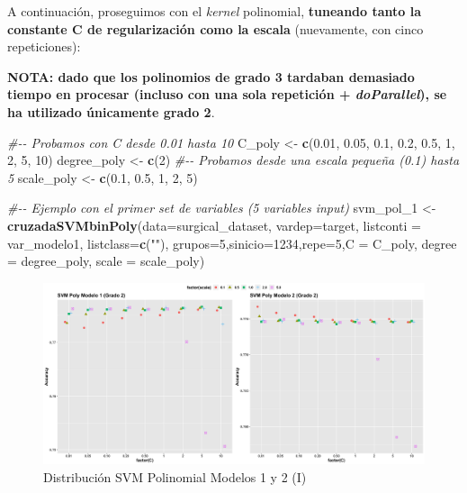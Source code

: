 \documentclass[
]{article}
\newenvironment{Shaded}{\begin{snugshade}}{\end{snugshade}}
\newcommand{\CommentTok}[1]{\textcolor[rgb]{0.56,0.35,0.01}{\textit{#1}}}
\newcommand{\DataTypeTok}[1]{\textcolor[rgb]{0.13,0.29,0.53}{#1}}
\newcommand{\DecValTok}[1]{\textcolor[rgb]{0.00,0.00,0.81}{#1}}
\newcommand{\FloatTok}[1]{\textcolor[rgb]{0.00,0.00,0.81}{#1}}
\newcommand{\KeywordTok}[1]{\textcolor[rgb]{0.13,0.29,0.53}{\textbf{#1}}}
\newcommand{\NormalTok}[1]{#1}
\newcommand{\StringTok}[1]{\textcolor[rgb]{0.31,0.60,0.02}{#1}}
\begin{document}
A continuación, proseguimos con el \emph{kernel} polinomial,
\textbf{tuneando tanto la constante C de regularización como la escala}
(nuevamente, con cinco repeticiones):

\textbf{NOTA: dado que los polinomios de grado 3 tardaban demasiado
tiempo en procesar (incluso con una sola repetición +
\emph{doParallel}), se ha utilizado únicamente grado 2}.

\begin{Shaded}
\begin{Highlighting}[]
\CommentTok{\#{-}{-} Probamos con C desde 0.01 hasta 10}
\NormalTok{C\_poly      <{-}}\StringTok{ }\KeywordTok{c}\NormalTok{(}\FloatTok{0.01}\NormalTok{, }\FloatTok{0.05}\NormalTok{, }\FloatTok{0.1}\NormalTok{, }\FloatTok{0.2}\NormalTok{, }\FloatTok{0.5}\NormalTok{, }\DecValTok{1}\NormalTok{, }\DecValTok{2}\NormalTok{, }\DecValTok{5}\NormalTok{, }\DecValTok{10}\NormalTok{)}
\NormalTok{degree\_poly <{-}}\StringTok{ }\KeywordTok{c}\NormalTok{(}\DecValTok{2}\NormalTok{)}
\CommentTok{\#{-}{-} Probamos desde una escala pequeña (0.1) hasta 5}
\NormalTok{scale\_poly  <{-}}\StringTok{ }\KeywordTok{c}\NormalTok{(}\FloatTok{0.1}\NormalTok{, }\FloatTok{0.5}\NormalTok{, }\DecValTok{1}\NormalTok{, }\DecValTok{2}\NormalTok{, }\DecValTok{5}\NormalTok{)}

\CommentTok{\#{-}{-} Ejemplo con el primer set de variables (5 variables input)}
\NormalTok{svm\_pol\_}\DecValTok{1}\NormalTok{ <{-}}\StringTok{ }\KeywordTok{cruzadaSVMbinPoly}\NormalTok{(}\DataTypeTok{data=}\NormalTok{surgical\_dataset, }\DataTypeTok{vardep=}\NormalTok{target,}
                               \DataTypeTok{listconti =}\NormalTok{ var\_modelo1, }\DataTypeTok{listclass=}\KeywordTok{c}\NormalTok{(}\StringTok{""}\NormalTok{),}
                               \DataTypeTok{grupos=}\DecValTok{5}\NormalTok{,}\DataTypeTok{sinicio=}\DecValTok{1234}\NormalTok{,}\DataTypeTok{repe=}\DecValTok{5}\NormalTok{,}\DataTypeTok{C =}\NormalTok{ C\_poly,}
                               \DataTypeTok{degree =}\NormalTok{ degree\_poly, }\DataTypeTok{scale =}\NormalTok{ scale\_poly)}
\end{Highlighting}
\end{Shaded}

\begin{figure}[h!]

{\centering \includegraphics[width=0.99\linewidth,height=0.99\textheight,]{./charts/SVM/06_svm_poly_modelo1_2} 

}

\caption{Distribución SVM Polinomial Modelos 1 y 2 (I)}\label{fig:unnamed-chunk-119}
\end{figure}
\end{document}
